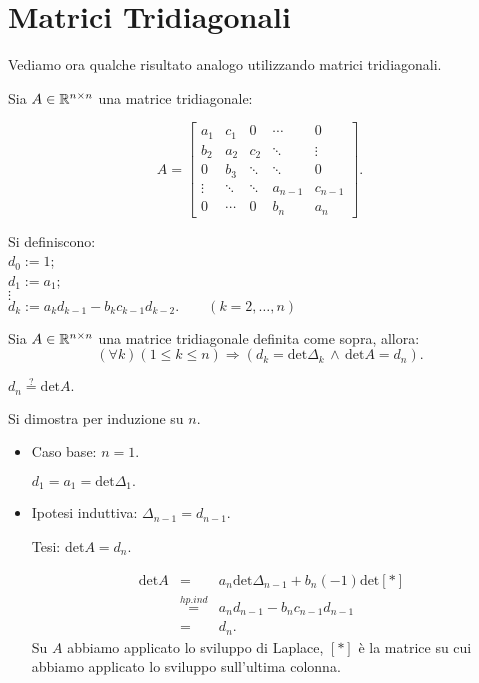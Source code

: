 
\section{Matrici Tridiagonali}

Vediamo ora qualche risultato analogo utilizzando matrici tridiagonali.

\begin{defi}Sia $A \in \mathbb{R}^{n \times n}$ una matrice tridiagonale:

\[ A =
\left[ \begin{array}{ccccc}
a_1    & c_1    & 0      & \cdots & 0 \\
b_2    & a_2    & c_2    & \ddots & \vdots \\
0      & b_3    & \ddots & \ddots & 0 \\
\vdots & \ddots & \ddots & a_{n-1}& c_{n-1} \\
0      & \cdots & 0      & b_{n} & a_n
\end{array} \right].
\]

Si definiscono:\\
$d_0 :=  1$;   \\
$d_1 :=  a_1$; \\
$\vdots$      \\
$d_k :=  a_k d_{k-1} - b_kc_{k-1}d_{k-2}. \qquad (k = 2, \ldots, n)$\\
\end{defi}

\begin{prop}Sia $A \in \mathbb{R}^{n \times n}$ una matrice tridiagonale
definita come sopra, allora:
\[(\forall k) (1\leq k \leq n) \Rightarrow
(d_k = \textrm{det}\Delta_k \, \wedge \, \textrm{det}A = d_n).\]
\end{prop}
\begin{dimo}$d_n \stackrel{?}{=}\textrm{det}A.$

Si dimostra per induzione su $n$.
\begin{itemize}
\item[]Caso base: $n = 1$.
\begin{flushleft}
$d_1 = a_1 = \textrm{det}\Delta_1.$
\end{flushleft}
\item[]Ipotesi induttiva: $\Delta_{n-1} = d_{n-1}$.
\begin{flushleft}
Tesi: det$A = d_n$.
\end{flushleft}

\[
\begin{array}{lcl}
\textrm{det}A & = & a_n\textrm{det}\Delta_{n-1} + b_n(-1)\textrm{det}[*]\\
              & \stackrel{hp. ind}{=} & a_nd_{n-1} - b_nc_{n-1}d_{n-1} \\
              & = & d_n.
\end{array}
\]
Su $A$ abbiamo applicato lo sviluppo di Laplace, $[*]$ è la matrice su cui
abbiamo applicato lo sviluppo sull'ultima colonna.
\end{itemize}
\end{dimo}

